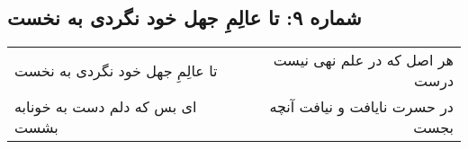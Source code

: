 \begin{center}
\section*{شماره ۹: تا عالِمِ جهل خود نگردی به نخست}
\label{sec:009}
\begin{longtable}{l p{0.5cm} r}
تا عالِمِ جهل خود نگردی به نخست
&&
هر اصل که در علم نهی نیست درست
\\
ای بس که دلم دست به خونابه بشست
&&
در حسرت نایافت و نیافت آنچه بجست
\\
\end{longtable}
\end{center}
